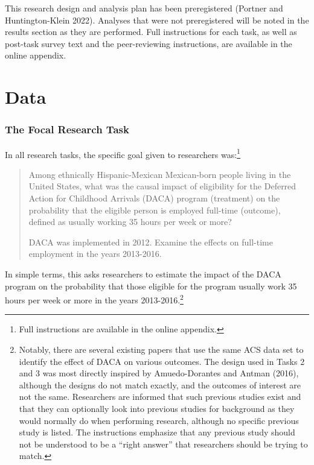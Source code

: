 \documentclass[
  letterpaper,
  DIV=11,
  numbers=noendperiod]{scrartcl}
\begin{document}
This research design and analysis plan has been preregistered (Portner
and Huntington-Klein 2022). Analyses that were not preregistered will be
noted in the results section as they are performed. Full instructions
for each task, as well as post-task survey text and the peer-reviewing
instructions, are available in the online appendix.

\hypertarget{data}{%
\section{Data}\label{data}}

\hypertarget{the-focal-research-task}{%
\subsubsection{The Focal Research Task}\label{the-focal-research-task}}

\label{sec:focaltask}

In all research tasks, the specific goal given to researchers
was:\footnote{Full instructions are available in the online appendix.}

\begin{quote}
Among ethnically Hispanic-Mexican Mexican-born people living in the
United States, what was the causal impact of eligibility for the
Deferred Action for Childhood Arrivals (DACA) program (treatment) on the
probability that the eligible person is employed full-time (outcome),
defined as usually working 35 hours per week or more?

DACA was implemented in 2012. Examine the effects on full-time
employment in the years 2013-2016.
\end{quote}

In simple terms, this asks researchers to estimate the impact of the
DACA program on the probability that those eligible for the program
usually work 35 hours per week or more in the years
2013-2016.\footnote{Notably, there are several existing papers that use
  the same ACS data set to identify the effect of DACA on various
  outcomes. The design used in Tasks 2 and 3 was most directly inspired
  by Amuedo-Dorantes and Antman (2016), although the designs do not
  match exactly, and the outcomes of interest are not the same.
  Researchers are informed that such previous studies exist and that
  they can optionally look into previous studies for background as they
  would normally do when performing research, although no specific
  previous study is listed. The instructions emphasize that any previous
  study should not be understood to be a ``right answer'' that
  researchers should be trying to match.}
\end{document}
